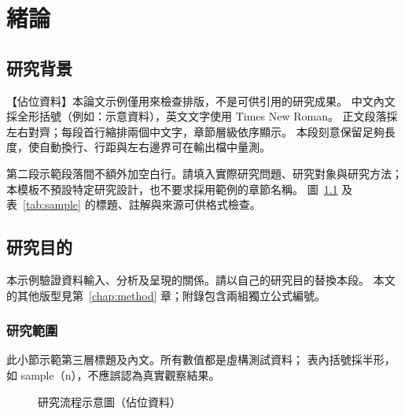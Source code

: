 \chapter{緒論}\label{chap:introduction}
\section{研究背景}
【佔位資料】本論文示例僅用來檢查排版，不是可供引用的研究成果。
中文內文採全形括號（例如：示意資料），英文文字使用 Times New Roman。
正文段落採左右對齊；每段首行縮排兩個中文字，章節層級依序顯示。
本段刻意保留足夠長度，使自動換行、行距與左右邊界可在輸出檔中量測。

第二段示範段落間不額外加空白行。請填入實際研究問題、研究對象與研究方法；
本模板不預設特定研究設計，也不要求採用範例的章節名稱。
圖~\ref{fig:workflow} 及表~\ref{tab:sample} 的標題、註解與來源可供格式檢查。

\section{研究目的}
本示例驗證資料輸入、分析及呈現的關係。請以自己的研究目的替換本段。
本文的其他版型見第~\ref{chap:method} 章；附錄包含兩組獨立公式編號。

\subsection{研究範圍}
此小節示範第三層標題及內文。所有數值都是虛構測試資料；
表內括號採半形，如 sample（n），不應誤認為真實觀察結果。

\begin{figure}[htbp]
  \centering
  \setlength{\fboxsep}{10bp}
  \caption{研究流程示意圖（佔位資料）}\label{fig:workflow}
\end{figure}

